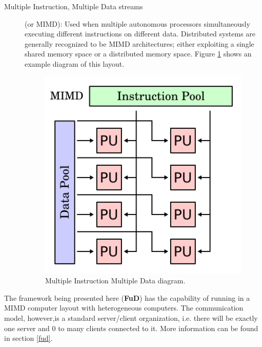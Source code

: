 \documentclass[a4paper,12pt,english]{report}
\newcommand{\fud}{\textbf{FuD}}
\begin{document}
\begin{description}
\item [Multiple Instruction, Multiple Data streams] (or MIMD): Used when multiple autonomous processors simultaneously executing different instructions on different data. Distributed systems are generally recognized to be MIMD architectures; either exploiting a single shared memory space or a distributed memory space. Figure \ref{mimd} shows an example diagram of this layout.

\begin{figure}[!ht]
\begin{center}
\includegraphics [bb= 0 0 200 200]{images/MIMD.png}
\end{center}
\caption{Multiple Instruction Multiple Data diagram.}
\label{mimd}
\end{figure}
\end{description}

The framework being presented here (\fud) has the capability of running in a MIMD computer layout with heterogeneous computers. The communication model, however,is a standard server/client organization, i.e. there will be exactly one server and 0 to many clients connected to it. More information can be found in section \ref{fud}. 



\end{document}
